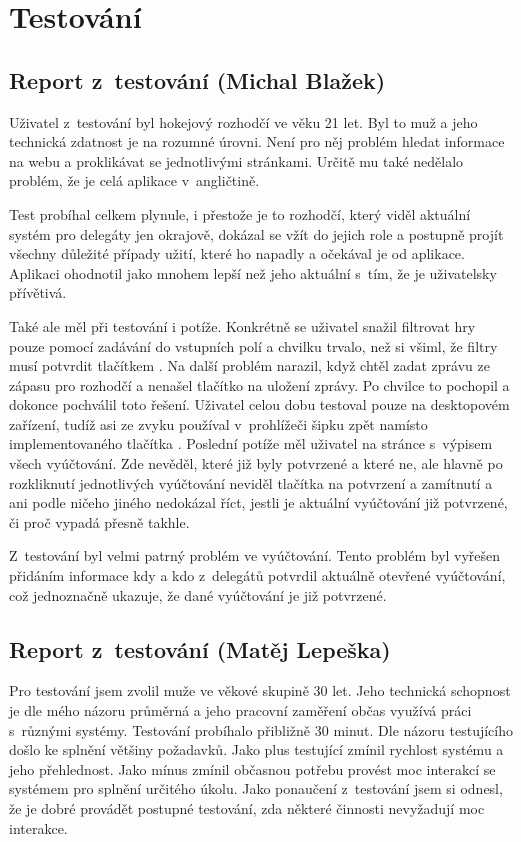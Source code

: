 \documentclass[a4paper, 11pt]{article}
\begin{document}
\section{Testování}

\subsection{Report z~testování (Michal Blažek)}

Uživatel z~testování byl hokejový rozhodčí ve věku 21 let. Byl to muž a jeho technická zdatnost je na rozumné úrovni. Není pro něj problém hledat informace na webu a proklikávat se jednotlivými stránkami. Určitě mu také nedělalo problém, že je celá aplikace v~angličtině.

Test probíhal celkem plynule, i přestože je to rozhodčí, který viděl aktuální systém pro delegáty jen okrajově, dokázal se vžít do jejich role a postupně projít všechny důležité případy užití, které ho napadly a očekával je od aplikace. Aplikaci ohodnotil jako mnohem lepší než jeho aktuální s~tím, že je uživatelsky přívětivá.

Také ale měl při testování i potíže. Konkrétně se uživatel snažil filtrovat hry pouze pomocí zadávání do vstupních polí a chvilku trvalo, než si všiml, že filtry musí potvrdit tlačítkem . Na další problém narazil, když chtěl zadat zprávu ze zápasu pro rozhodčí a nenašel tlačítko na uložení zprávy. Po chvilce to pochopil a dokonce pochválil toto řešení. Uživatel celou dobu testoval pouze na desktopovém zařízení, tudíž asi ze zvyku používal v~prohlížeči šipku zpět namísto implementovaného tlačítka . Poslední potíže měl uživatel na stránce s~výpisem všech vyúčtování. Zde nevěděl, které již byly potvrzené a které ne, ale hlavně po rozkliknutí jednotlivých vyúčtování neviděl tlačítka na potvrzení a zamítnutí a ani podle ničeho jiného nedokázal říct, jestli je aktuální vyúčtování již potvrzené, či proč vypadá přesně takhle.

Z~testování byl velmi patrný problém ve vyúčtování. Tento problém byl vyřešen přidáním informace kdy a kdo z~delegátů potvrdil aktuálně otevřené vyúčtování, což jednoznačně ukazuje, že dané vyúčtování je již potvrzené.

\subsection{Report z~testování (Matěj Lepeška)}

Pro testování jsem zvolil muže ve věkové skupině 30 let.  Jeho  technická schopnost je dle mého názoru průměrná a jeho pracovní zaměření občas využívá práci s~různými systémy. Testování probíhalo přibližně 30 minut. Dle názoru testujícího došlo ke splnění většiny požadavků. Jako plus testující zmínil rychlost systému a jeho přehlednost. Jako mínus zmínil občasnou potřebu provést moc interakcí se systémem pro splnění určitého úkolu. Jako ponaučení z~testování jsem si odnesl, že je dobré provádět postupné testování, zda některé činnosti nevyžadují moc interakce.
\end{document}
